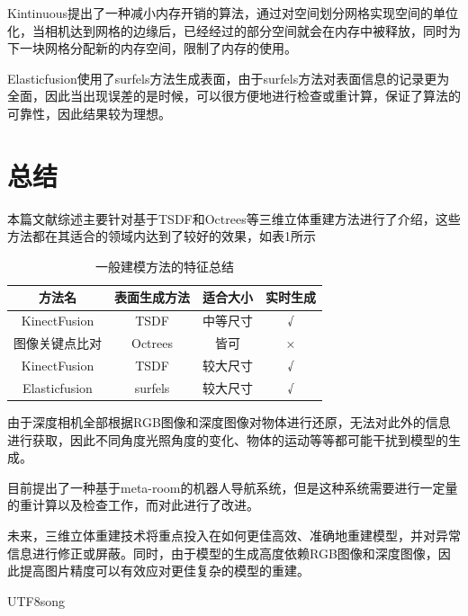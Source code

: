 \documentclass{llncs}
\begin{document}
\begin{CJK}{UTF8}{song}
Kintinuous\cite{DBLP:conf/icra/WhelanJKLM13}提出了一种减小内存开销的算法，通过对空间划分网格实现空间的单位化，当相机达到网格的边缘后，已经经过的部分空间就会在内存中被释放，同时为下一块网格分配新的内存空间，限制了内存的使用。

Elasticfusion使用了surfels方法\cite{DBLP:conf/siggraph/PfisterZBG00}生成表面，由于surfels方法对表面信息的记录更为全面，因此当出现误差的是时候，可以很方便地进行检查或重计算，保证了算法的可靠性，因此结果较为理想。

\section{总结}

本篇文献综述主要针对基于TSDF和Octrees等三维立体重建方法进行了介绍，这些方法都在其适合的领域内达到了较好的效果，如表1所示

\begin{table}
\label{sum}
\caption{一般建模方法的特征总结}
\centering
\begin{tabular}{cccc}
\toprule
\textbf{方法名}& \textbf{表面生成方法}& \textbf{适合大小}& \textbf{实时生成}\\
\midrule
KinectFusion& TSDF& 中等尺寸& √\\
图像关键点比对& Octrees& 皆可& ×\\
KinectFusion& TSDF& 较大尺寸& √\\
Elasticfusion& surfels& 较大尺寸& √\\
\bottomrule
\end{tabular}
\end{table}


由于深度相机全部根据RGB图像和深度图像对物体进行还原，无法对此外的信息进行获取，因此不同角度光照角度的变化、物体的运动等等都可能干扰到模型的生成。

目前\cite{DBLP:journals/ral/FaulhammerABZFH17}提出了一种基于meta-room\cite{DBLP:conf/iros/AmbrusBFJ14}的机器人导航系统，但是这种系统需要进行一定量的重计算以及检查工作，而\cite{DBLP:conf/icra/FehrFDSGSC17}对此进行了改进。

未来，三维立体重建技术将重点投入在如何更佳高效、准确地重建模型，并对异常信息进行修正或屏蔽。同时，由于模型的生成高度依赖RGB图像和深度图像，因此提高图片精度可以有效应对更佳复杂的模型的重建。


%

\end{CJK}{UTF8}{song}
\end{document}
